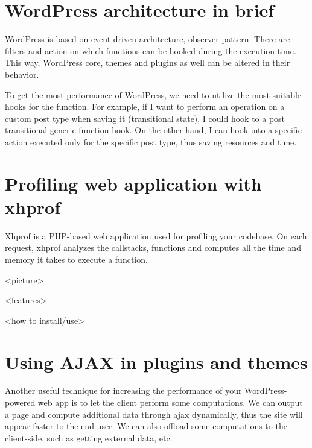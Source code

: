 \section{WordPress architecture in brief}

WordPress is based on event-driven architecture, observer pattern. There are filters and action on which functions can be hooked during the execution time. This way, WordPress core, themes and plugins as well can be altered in their behavior.

To get the most performance of WordPress, we need to utilize the most suitable hooks for the function. For example, if I want to perform an operation on a custom post type when saving it (transitional state), I could hook to a post transitional generic function hook. On the other hand, I can hook into a specific action executed only for the specific post type, thus saving resources and time.

\section{Profiling web application with xhprof}

Xhprof is a PHP-based web application used for profiling your codebase. On each request, xhprof analyzes the callstacks, functions and computes all the time and memory it takes to execute a function.

<picture>

<features>

<how to install/use>

\section{Using AJAX in plugins and themes}

Another useful technique for increasing the performance of your WordPress-powered web app is to let the client perform some computations. We can output a page and compute additional data through ajax dynamically, thus the site will appear faster to the end user. We can also offload some computations to the client-side, such as getting external data, etc.


